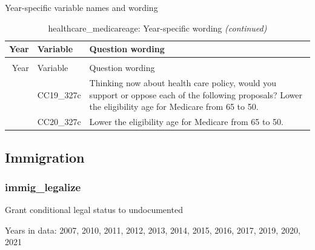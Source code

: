 \documentclass[
  12pt]{article}
\begin{document}
Year-specific variable names and
wording\begingroup\fontsize{11}{13}\selectfont

\begin{longtable}[t]{rl>{\raggedright\arraybackslash}p{10cm}}
\caption{\label{tab:unnamed-chunk-5}healthcare\_medicareage: Year-specific wording}\\
\toprule
Year & Variable & Question wording\\
\midrule
\endfirsthead
\caption[]{healthcare\_medicareage: Year-specific wording \textit{(continued)}}\\
\toprule
Year & Variable & Question wording\\
\midrule
\endhead

\endfoot
\bottomrule
\endlastfoot
2019 & CC19\_327c & Thinking now about health care policy, would you support or oppose each of the following proposals? Lower the eligibility age for Medicare from 65 to 50.\\
\addlinespace
2020 & CC20\_327c & Lower the eligibility age for Medicare from 65 to 50.\\*
\end{longtable}
\endgroup{}
\newpage

\hypertarget{immigration}{%
\subsection{Immigration}\label{immigration}}

\hypertarget{immig_legalize}{%
\subsubsection{immig\_legalize}\label{immig_legalize}}

Grant conditional legal status to undocumented

Years in data: 2007, 2010, 2011, 2012, 2013, 2014, 2015, 2016, 2017,
2019, 2020, 2021\begingroup\fontsize{10}{12}\selectfont
\end{document}
